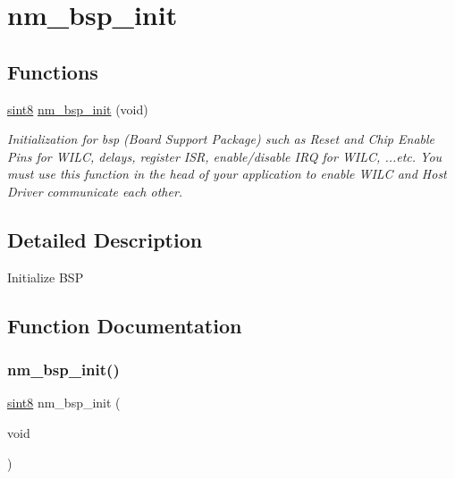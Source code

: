 \hypertarget{group__NmBspInitFn}{}\section{nm\+\_\+bsp\+\_\+init}
\label{group__NmBspInitFn}
\subsection*{Functions}
\begin{DoxyCompactItemize}
\item 
\hyperlink{group__DataT_gae35f10ffd0ac8dd2bc3e794da9bdfbc7}{sint8} \hyperlink{group__NmBspInitFn_ga91533a50cf3da832110a746b4a57789e}{nm\+\_\+bsp\+\_\+init} (void)
\begin{DoxyCompactList}\small\item\em Initialization for bsp ({\itshape Board} {\itshape Support} {\itshape Package}) such as Reset and Chip Enable Pins for W\+I\+LC, delays, register I\+SR, enable/disable I\+RQ for W\+I\+LC, ...etc. You must use this function in the head of your application to enable W\+I\+LC and Host Driver communicate each other. \end{DoxyCompactList}\end{DoxyCompactItemize}


\subsection{Detailed Description}
Initialize B\+SP 

\subsection{Function Documentation}
\mbox{\label{group__NmBspInitFn_ga91533a50cf3da832110a746b4a57789e}} 
\subsubsection{\texorpdfstring{nm\+\_\+bsp\+\_\+init()}{nm\_bsp\_init()}}
{\footnotesize\ttfamily \hyperlink{group__DataT_gae35f10ffd0ac8dd2bc3e794da9bdfbc7}{sint8} nm\+\_\+bsp\+\_\+init (\begin{DoxyParamCaption}\item[{void}]{ }\end{DoxyParamCaption})}



